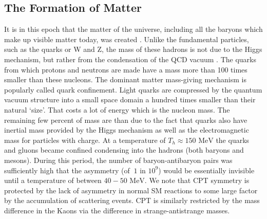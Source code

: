 \documentclass[universe,article,submit,moreauthors,pdftex,a4paper]{Definitions/mdpi}
\newcommand{\MeV}{\text{ MeV}}
\begin{document}
\subsection{The Formation of Matter}\label{sec:Creation}
\noindent It is in this epoch that the matter of the universe, including all the baryons which make up visible matter today, was created \cite{Rafelski:2019twp}. Unlike the fundamental particles, such as the quarks or W and Z, the mass of these hadrons is not due to the Higgs mechanism, but rather from the condensation of the QCD vacuum \cite{Rafelski:2015cxa,Roberts:2021xnz,Roberts:2022rxm}. The quarks from which protons and neutrons are made have a mass more than 100 times smaller than these nucleons. The dominant matter mass-giving mechanism is  popularly called quark confinement. Light quarks are compressed by the quantum vacuum structure into a small space domain  a hundred times smaller than their natural `size'. That costs a lot of energy which is  the nucleon mass. The remaining few percent of mass are than due to the fact that quarks also have inertial mass provided by the Higgs mechanism as well as the electromagnetic mass for particles with charge. At a temperature of $T_{h}\approx150\MeV$ the quarks and gluons became confined condensing into the hadrons (both baryons and mesons). During this period, the number of baryon-antibaryon pairs was sufficiently high that the asymmetry (of $~1$ in $10^{9}$) would be essentially invisible until a temperature of between $40-50\MeV$. We note that CPT symmetry is protected by the lack of asymmetry in normal SM reactions to some large factor by the accumulation of scattering events. CPT is similarly restricted by the mass difference in the Kaons via the difference in strange-antistrange masses.
\end{document}
